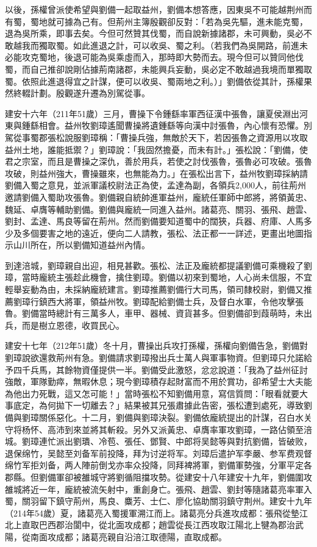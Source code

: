 以後，孫權曾派使希望與劉備一起取益州，劉備本想答應，因東吳不可能越荆州而有蜀，蜀地就可據為己有。但荊州主簿殷觀卻反對：「若為吳先驅，進未能克蜀，退為吳所乘，即事去矣。今但可然贊其伐蜀，而自說新據諸郡，未可興動，吳必不敢越我而獨取蜀。如此進退之計，可以收吳、蜀之利。（若我們為吳開路，前進未必能攻克蜀地，後退可能為吳乘虛而入，那時即大勢而去。現今但可以贊同他伐蜀，而自己推卻說剛佔據荊南諸郡，未能興兵妄動，吳必定不敢越過我境而單獨取蜀。依照此進退得宜之計謀，便可以收吳、蜀兩地之利。）」劉備依從其計，孫權果然終輟計劃。殷觀遂升遷為別駕從事。

建安十六年（211年51歲）三月，曹操下令鍾繇率軍西征漢中張魯，讓夏侯淵出河東與鍾繇相會。益州牧劉璋遙聞曹操將遺鍾繇等向漢中討張魯，內心懷有恐懼。別駕從事蜀郡張松說服劉璋稱：「曹操兵強，無敵於天下，若因張魯之資源用以攻取益州土地，誰能抵禦？」劉璋說：「我固然擔憂，而未有計。」張松說：「劉備，使君之宗室，而且是曹操之深仇，善於用兵，若使之討伐張魯，張魯必可攻破。張魯攻破，則益州強大，曹操雖來，也無能為力。」在張松出言下，益州牧劉璋採納請劉備入蜀之意見，並派軍議校尉法正為使，孟達為副，各領兵2,000人，前往荊州邀請劉備入蜀助攻張魯。劉備親自統帥進軍益州，龐統任軍師中郎將，將領黃忠、魏延、卓膺等輔助劉備。劉備與龐統一同進入益州。諸葛亮、關羽、張飛、趙雲、劉封、孟達、馬良等留在荊州。然而劉備要知道蜀中的闊狹，兵器、府庫、人馬多少及多個要害之地的遠近，便向二人請教，張松、法正都一一詳述，更畫出地圖指示山川所在，所以劉備知道益州內情。

到達涪城，劉璋親自出迎，相見甚歡。張松、法正及龐統都提議劉備可乘機殺了劉璋，當時龐統主張趁此機會，擒住劉璋。劉備以初來到蜀地，人心尚未信服，不宜輕舉妄動為由，未採納龐統建言。劉璋推薦劉備行大司馬，領司隸校尉，劉備又推薦劉璋行鎮西大將軍，領益州牧。劉璋配給劉備士兵，及督白水軍，令他攻擊張魯。劉備當時總計有三萬多人，車甲、器械、資貨甚多。但劉備卻到葭萌時，未出兵，而是樹立恩德，收買民心。

建安十七年（212年51歲）冬十月，曹操出兵攻打孫權，孫權向劉備告急，劉備對劉璋說欲還救荊州有急。劉備請求劉璋撥出兵士萬人與軍事物資。但劉璋只允諾給予四千兵馬，其餘物資僅提供一半。劉備受此激怒，忿忿說道：「我為了益州征討強敵，軍隊勤瘁，無暇休息；現今劉璋積存起財富而不用於賞功，卻希望士大夫能為他出力死戰，這又怎可能！」當時張松不知劉備用意，寫信質問：「眼看就要大事底定，為何拋下一切離去？」結果被其兄張肅據此告密，張松遭到處死，導致劉備與劉璋關係惡化。十二月，劉備與劉璋決裂。劉備依龐統提出的計謀，召白水关守将杨怀、高沛到來並將其斬殺。另外又派黃忠、卓膺率軍攻劉璋，一路佔領至涪城。劉璋連忙派出劉璝、冷苞、張任、鄧賢、中郎将吴懿等與對抗劉備，皆破败，退保绵竹，吴懿至刘备军前投降，拜为讨逆将军。刘璋后遣护军李嚴、参军费观督绵竹军拒刘备，两人陣前倒戈亦率众投降，同拜裨將軍，劉備軍勢強，分軍平定各郡縣。但劉備軍卻被雒城守將劉循阻擋攻勢。從建安十八年建安十九年，劉備圍攻雒城將近一年，龐統被流矢射中，重創身亡。張飛、趙雲、劉封等隨諸葛亮率軍入蜀，關羽留下鎮守荊州，馬良、麋芳、士仁、廖化協助關羽鎮守荆州。建安十九年（214年54歲）夏，諸葛亮入蜀援軍溯江而上。諸葛亮分兵進攻成都：張飛從墊江北上直取巴西郡治閬中，從北面攻成都；趙雲從長江西攻取江陽北上犍為郡治武陽，從南面攻成都；諸葛亮親自沿涪江取德陽，直取成都。

